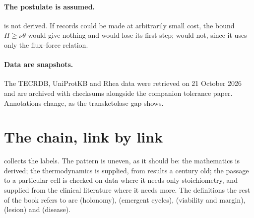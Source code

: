 \paragraph{The postulate is assumed.}  is not derived.
If records could be made at arbitrarily small cost, the bound
$\Pi\ge\nu\theta$ would give nothing and  would
lose its first step;  would not, since it uses only
the flux--force relation.

\paragraph{Data are snapshots.} The TECRDB, UniProtKB and Rhea data were
retrieved on 21 October 2026 and are archived with checksums alongside the
companion tolerance paper. Annotations change, as the transketolase gap
shows.

\section{The chain, link by link}
\label{c1:sec-ledger}

 collects the labels. The pattern is uneven, as it
should be: the mathematics is derived; the thermodynamics is supplied, from
results a century old; the passage to a particular cell is checked on data
where it needs only stoichiometry, and supplied from the clinical literature
where it needs more. The definitions the rest of the book refers to are
 (holonomy),  (emergent cycles),
 (viability and margin), 
(lesion) and  (disease).

